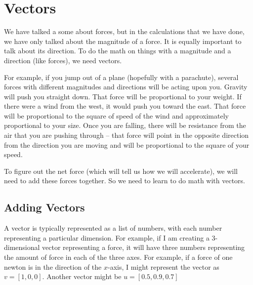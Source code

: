 \chapter{Vectors}

We have talked a some about forces, but in the calculations that we
have done, we have only talked about the magnitude of a force. It is
equally important to talk about its direction. To do the math on
things with a magnitude and a direction (like forces), we need vectors.

For example, if you jump out of a plane (hopefully with a parachute), 
several forces with different magnitudes and directions will be acting upon 
you. Gravity will push you straight down. That force will be proportional to your weight.
If there were a wind from the west, it would push you toward the east. That force
will be proportional to the square of speed of the wind and approximately proportional to 
your size. Once you are falling, there will be resistance from the air 
that you are pushing through -- that force will point in the opposite direction
from the direction you are moving and will be proportional to the square of your
speed.

To figure out the net force (which will tell us how we will accelerate), we will 
need to add these forces together. So we need to learn to do math with vectors.

\section{Adding Vectors}

A vector is typically represented as a list of numbers, with each
number representing a particular dimension. For example, if I am
creating a 3-dimensional vector representing a force, it will have
three numbers representing the amount of force in each of the three
axes. For example, if a force of one newton is in the direction of the
$x$-axis, I might represent the vector as $v = [1, 0, 0]$. 
Another vector might be $u = [0.5, 0.9, 0.7]$ 


